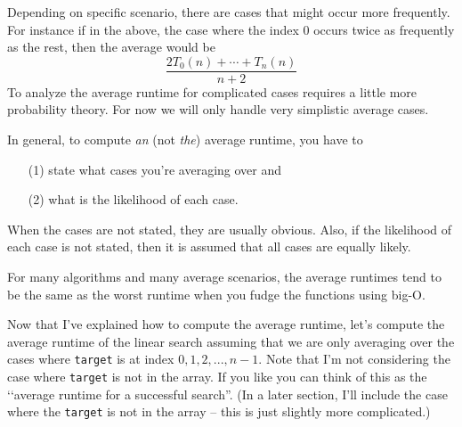 Depending on specific scenario, 
there are cases that might occur more frequently.
For instance if in the above, the case where the index 0 occurs twice
as frequently as the rest, then the average would be
\[
\frac{2T_0(n) + \cdots + T_n(n)}{n + 2}
\]
To analyze the average runtime for
complicated cases requires a little more probability theory.
For now we will only handle very simplistic average cases.

In general, to compute \textit{an} (not \textit{the}) 
average runtime, you have to 
\begin{enumerate}[nosep]
\item[(1)] state what cases you're averaging over and 
\item[(2)] what is the likelihood of each case.
\end{enumerate}
When the cases are not stated, they are usually obvious.
Also, if the likelihood of each case is not stated, then it is assumed
that all cases are equally likely.

For many algorithms and many average scenarios, 
the average runtimes tend to be
the same as the worst runtime when you fudge the functions using big-O. 

Now that I've explained how to compute the average runtime, let's
compute the average runtime of the linear search assuming that we
are only averaging over the cases where
\verb!target! is at index $0, 1, 2, ...,  n - 1$.
Note that I'm not considering the case 
where \verb!target! is not in the array.
If you like you can think of this as the 
\lq\lq average runtime for a successful search''.
(In a later section, I'll include the case where the \verb!target!
is not in the array -- this is just slightly more complicated.)

